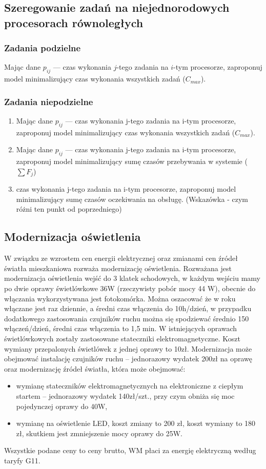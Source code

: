 \documentclass[
    12pt, %
]{../fphw}
\begin{document}
\subsection{Szeregowanie zadań na niejednorodowych procesorach równoległych}
\subsubsection{Zadania podzielne}
Mając dane \(p_{ij}\) — czas wykonania \(j\)-tego zadania na \(i\)-tym procesorze,
zaproponuj model minimalizujący czas wykonania wszystkich zadań (\(C_{max}\)).
\subsubsection{Zadania niepodzielne}
\begin{enumerate}[label=(\alph*)]
    \item Mając dane \(p_{ij}\) — czas wykonania j-tego zadania na i-tym procesorze,
          zaproponuj model minimalizujący czas wykonania wszystkich
          zadań (\(C_{max}\)).
    \item Mając dane \(p_{ij}\) — czas wykonania j-tego zadania na i-tym procesorze,
          zaproponuj model minimalizujący sumę czasów przebywania w
          systemie (\(\sum F_j\))
    \item czas wykonania j-tego zadania na i-tym procesorze,
          zaproponuj model minimalizujący sumę czasów oczekiwania na obsługę.
          (Wskazówka - czym różni ten punkt od poprzedniego)
\end{enumerate}

\subsection{Modernizacja oświetlenia}
W związku ze wzrostem cen energii elektrycznej oraz zmianami cen źródeł światła mieszkaniowa rozważa modernizację oświetlenia. Rozważana jest
modernizacja oświetlenia wejść do 3 klatek schodowych, w każdym wejściu
mamy po dwie oprawy świetlówkowe 36W (rzeczywisty pobór mocy 44 W),
obecnie do włączania wykorzystywana jest fotokomórka. Można oszacować
że w roku włączane jest raz dziennie, a średni czas włączenia do 10h/dzień, w
przypadku dodatkowego zastosowania czujników ruchu można się spodziewać
średnio 150 włączeń/dzień, średni czas włączenia to 1,5 min.
W istniejących oprawach świetlówkowych zostały zastosowane stateczniki elektromagnetyczne. Koszt wymiany przepalonych świetlówek z jednej
oprawy to 10zł. Modernizacja może obejmować instalację czujników ruchu
– jednorazowy wydatek 200zł na oprawę oraz modernizację źródeł światła,
która może obejmować:
\begin{itemize}
    \item wymianę stateczników elektromagnetycznych na elektroniczne z ciepłym startem
          – jednorazowy wydatek 140zł/szt., przy czym obniża się moc pojedynczej oprawy do 40W,
    \item wymianę na oświetlenie LED, koszt zmiany to 200 zł, koszt wymiany
          to 180 zł, skutkiem jest zmniejszenie mocy oprawy do 25W.
\end{itemize}
Wszystkie podane ceny to ceny brutto, WM płaci za energię elektryczną według taryfy G11.
\end{document}
